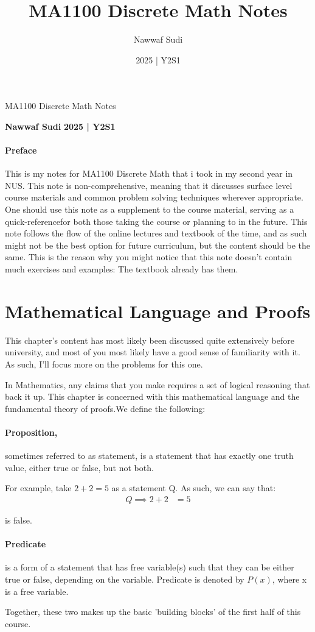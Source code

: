 \documentclass[a4paper]{article}
\title{MA1100 Discrete Math Notes}
\author{Nawwaf Sudi}
\date{2025 | Y2S1}
\begin{document}
\begin{center}
\Huge{MA1100 Discrete Math Notes}
\end{center}



\noindent \textbf{Nawwaf Sudi} \hfill \textbf{2025 | Y2S1}
\paragraph{Preface}
This is my notes for MA1100 Discrete Math that i took in my second year in NUS. This note is non-comprehensive, meaning that it discusses surface level course materials and common problem solving techniques wherever appropriate. One should use this note as a supplement to the course material, serving as a quick-referencefor both those taking the course or planning to in the future.
This note follows the flow of the online lectures and textbook of the time, and as such might not be the best option for future curriculum, but the content should be the same. This is the reason why you might notice that this note doesn't contain much exercises and examples: The textbook already has them.
\section{Mathematical Language and Proofs}
This chapter's content has most likely been discussed quite extensively before university, and most of you most likely have a good sense of familiarity with it. As such, I'll focus more on the problems for this one.


In Mathematics, any claims that you make requires a set of logical reasoning that back it up. This chapter is concerned with this mathematical language and the fundamental theory of proofs.We define the following:
\begin{tcolorbox}[title=Definition]
	\paragraph{Proposition,}
	sometimes referred to as statement, is a statement that has exactly one truth value, either true or false, but not both. 
\end{tcolorbox}
For example, take $2 + 2 = 5$ as a statement Q. 
As such, we can say that:
\begin{align*}
	Q \implies 2 + 2 &= 5 
\end{align*}

is false.
\begin{tcolorbox}[title=Definition]
	\paragraph{Predicate}is a form of a statement that has free variable(s) such that they can be either true or false, depending on the variable. Predicate is denoted by $P(x)$, where x is a free variable.
\end{tcolorbox}
Together, these two makes up the basic 'building blocks' of the first half of this course.
\end{document}
